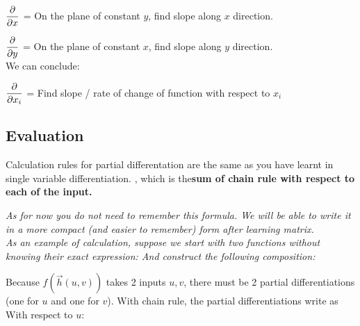 \documentclass[class=article, crop=false, 12pt]{standalone}
\begin{document}

$\pdvv{x}$ = On the plane of constant $y$, find slope along $x$ direction.

$\pdvv{y}$ = On the plane of constant $x$, find slope along $y$ direction.\\


We can conclude: 
\begin{center}
    $\pdvv{x_i}$ = Find slope / rate of change of function with respect to $x_i$
\end{center}


\subsection{Evaluation}

Calculation rules for partial differentation are the same as you have learnt in single variable differentiation. 
, which is the\bf{sum of chain rule with respect to each of the input.}


\it{As for now you do not need to remember this formula. We will be able to write it in a more compact (and easier to remember) form after learning matrix.}\\

As an example of calculation, suppose we start with two functions without knowing their exact expression: 
And construct the following composition:

Because $f(\vec{h}(u,v))$ takes 2 inputs $u,v$, there must be 2 partial differentiations (one for $u$ and one for $v$).
With chain rule, the partial differentiations write as \\

With respect to $u$:
\end{document}
